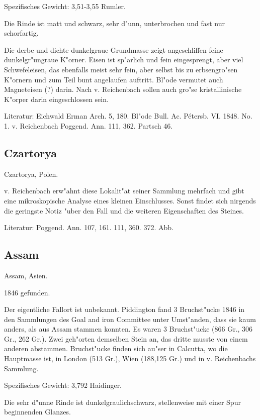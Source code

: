 \documentclass[a4paper, 11pt, oneside]{article}
\begin{document}
Spezifisches Gewicht: 3,51-3,55 Rumler.

Die Rinde ist matt und schwarz, sehr d"unn, unterbrochen und fast nur schorfartig.

Die derbe und dichte dunkelgraue Grundmasse zeigt angeschliffen feine dunkelgr"ungraue K"orner. Eisen ist sp"arlich und fein eingesprengt, aber viel Schwefeleisen, das ebenfalls meist sehr fein, aber selbst bis zu erbsengro"sen K"ornern und zum Teil bunt angelaufen auftritt. Bl"ode vermutet auch Magneteisen (?) darin. Nach v. Reichenbach sollen auch gro"se kristallinische K"orper darin eingeschlossen sein.

Literatur: Eichwald Erman Arch. 5, 180. Bl"ode Bull. Ac. Pétersb. VI. 1848. No. 1. v. Reichenbach Poggend. Ann. 111, 362. Partsch 46.

\subsection{Czartorya}

Czartorya, Polen.

v. Reichenbach erw"ahnt diese Lokalit"at seiner Sammlung mehrfach und gibt eine mikroskopische Analyse eines kleinen Einschlusses. Sonst findet sich nirgends die geringste Notiz "uber den Fall und die weiteren Eigenschaften des Steines.

Literatur: Poggend. Ann. 107, 161. 111, 360. 372. Abb.

\subsection{Assam}

Assam, Asien.

1846 gefunden.

Der eigentliche Fallort ist unbekannt. Piddington fand 3 Bruchst"ucke 1846 in den Sammlungen des Goal and iron Committee unter Umst"anden, dass sie kaum anders, als aus Assam stammen konnten. Es waren 3 Bruchst"ucke (866 Gr., 306 Gr., 262 Gr.). Zwei geh"orten demselben Stein an, das dritte musste von einem anderen abstammen. Bruchst"ucke finden sich au"ser in Calcutta, wo die Hauptmasse ist, in London (513 Gr.), Wien (188,125 Gr.) und in v. Reichenbachs Sammlung.

Spezifisches Gewicht: 3,792 Haidinger.

Die sehr d"unne Rinde ist dunkelgraulichschwarz, stellenweise mit einer Spur beginnenden Glanzes.
\end{document}
